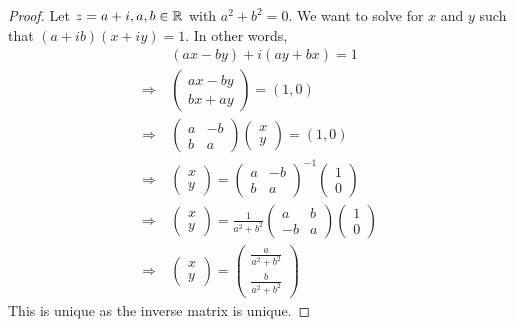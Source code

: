 \documentclass[11pt]{article}
\begin{document}
\begin{proof}
	Let $z = a+i, a,b \in \mathbb{R}$ with $a^2+b^2 = 0$. We want to solve for $x$
	and $y$ such that $(a+ib)(x+iy) = 1$. In other words,
	\begin{align*}
		&\> (ax-by)+i(ay+bx) = 1\\
		\Rightarrow &\>
		\begin{pmatrix}
			ax-by \\ bx+ay
		\end{pmatrix}
		= (1,0)\\
		\Rightarrow &\>
		\begin{pmatrix}
			a & -b\\
			b & a
		\end{pmatrix}
		\begin{pmatrix}
			x \\ y
		\end{pmatrix}
		= (1,0)\\
		\Rightarrow &\>
		\begin{pmatrix}
			x \\ y
		\end{pmatrix}
		=
		\begin{pmatrix}
			a & -b\\
			b & a
		\end{pmatrix}^{-1}
		\begin{pmatrix}
			1 \\ 0
		\end{pmatrix}\\
		\Rightarrow &\>
		\begin{pmatrix}
			x \\ y
		\end{pmatrix}
		=
		\frac{1}{a^2+b^2}
		\begin{pmatrix}
			a & b\\
			-b & a
		\end{pmatrix}
		\begin{pmatrix}
			1 \\ 0
		\end{pmatrix}\\
		\Rightarrow &\>
		\begin{pmatrix}
			x \\ y
		\end{pmatrix}
		=
		\begin{pmatrix}
			\frac{a}{a^2+b^2} \\ \frac{b}{a^2+b^2}
		\end{pmatrix}
	\end{align*}
	This is unique as the inverse matrix is unique.
\end{proof}
\end{document}
